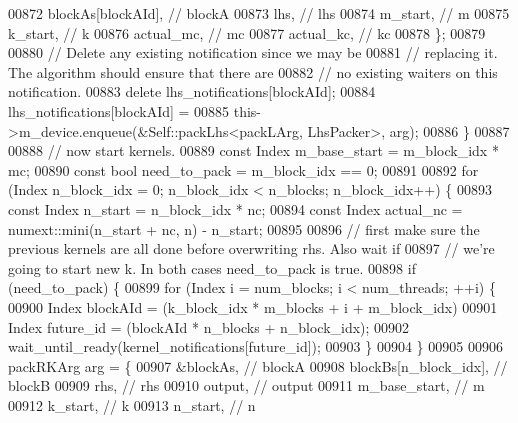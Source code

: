 \begin{DoxyCode}
{00872             blockAs[blockAId], \textcolor{comment}{// blockA}
00873             lhs,        \textcolor{comment}{// lhs}
00874             m\_start,    \textcolor{comment}{// m}
00875             k\_start,    \textcolor{comment}{// k}
00876             actual\_mc,  \textcolor{comment}{// mc}
00877             actual\_kc,  \textcolor{comment}{// kc}
00878           \};
00879 
00880           \textcolor{comment}{// Delete any existing notification since we may be}
00881           \textcolor{comment}{// replacing it.  The algorithm should ensure that there are}
00882           \textcolor{comment}{// no existing waiters on this notification.}
00883           \textcolor{keyword}{delete} lhs\_notifications[blockAId];
00884           lhs\_notifications[blockAId] =
00885           this->m\_device.enqueue(&Self::packLhs<packLArg, LhsPacker>, arg);
00886         \}
00887 
00888         \textcolor{comment}{// now start kernels.}
00889         \textcolor{keyword}{const} Index m\_base\_start = m\_block\_idx * mc;
00890         \textcolor{keyword}{const} \textcolor{keywordtype}{bool} need\_to\_pack = m\_block\_idx == 0;
00891 
00892         \textcolor{keywordflow}{for} (Index n\_block\_idx = 0; n\_block\_idx < n\_blocks; n\_block\_idx++) \{
00893           \textcolor{keyword}{const} Index n\_start = n\_block\_idx * nc;
00894           \textcolor{keyword}{const} Index actual\_nc = numext::mini(n\_start + nc, n) - n\_start;
00895 
00896           \textcolor{comment}{// first make sure the previous kernels are all done before overwriting rhs. Also wait if}
00897           \textcolor{comment}{// we're going to start new k. In both cases need\_to\_pack is true.}
00898           \textcolor{keywordflow}{if} (need\_to\_pack) \{
00899             \textcolor{keywordflow}{for} (Index i = num\_blocks; i < num\_threads; ++i) \{
00900               Index blockAId = (k\_block\_idx * m\_blocks + i + m\_block\_idx) %
00901               Index future\_id = (blockAId * n\_blocks + n\_block\_idx);
00902               wait\_until\_ready(kernel\_notifications[future\_id]);
00903             \}
00904           \}
00905 
00906           packRKArg arg = \{
00907             &blockAs, \textcolor{comment}{// blockA}
00908             blockBs[n\_block\_idx], \textcolor{comment}{// blockB}
00909             rhs,          \textcolor{comment}{// rhs}
00910             output,       \textcolor{comment}{// output}
00911             m\_base\_start, \textcolor{comment}{// m}
00912             k\_start,      \textcolor{comment}{// k}
00913             n\_start,      \textcolor{comment}{// n}
}
\end{DoxyCode}
